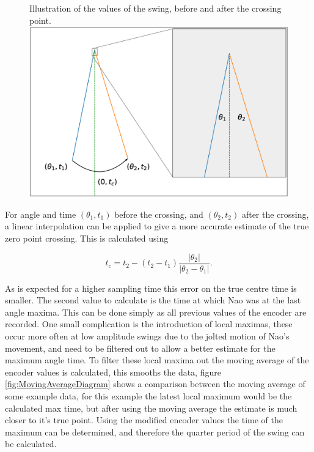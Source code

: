 \documentclass[11pt]{article}
\begin{document}
    \begin{figure}[!htb]
        \centering
        \captionbox
             {Illustration of the values of the swing, before and after the crossing point.\label{fig:InterpolationDiagram}}
             {\includegraphics[width=1.0\textwidth]{InterpolationDiagram.eps}}
    \end{figure}

For angle and time $(\theta_1, t_1)$ before the crossing, and $(\theta_2, t_2)$ after the crossing, a linear interpolation can be applied to give a more accurate estimate of the true zero point crossing. This is calculated using

\begin{equation}
    t_c = t_2 - (t_2 - t_1) \frac{|\theta_2|}{|\theta_2 - \theta_1|}.
\end{equation}

As is expected for a higher sampling time this error on the true centre time is smaller. The second value to calculate is the time at which Nao was at the last angle maxima. This can be done simply as all previous values of the encoder are recorded. One small complication is the introduction of local maximas, these occur more often at low amplitude swings due to the jolted motion of Nao's movement, and need to be filtered out to allow a better estimate for the maximum angle time. To filter these local maxima out the moving average of the encoder values is calculated, this smooths the data, figure \ref{fig:MovingAverageDiagram} shows a comparison between the moving average of some example data, for this example the latest local maximum would be the calculated max time, but after using the moving average the estimate is much closer to it's true point. Using the modified encoder values the time of the maximum can be determined, and therefore the quarter period of the swing can be calculated. \\
\end{document}
